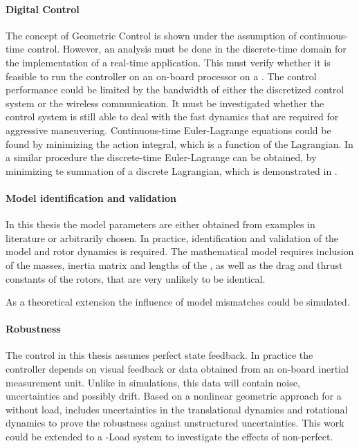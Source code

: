 \paragraph{Digital Control} The concept of Geometric Control is shown under the assumption of continuous-time control. 
However, an analysis must be done in the discrete-time domain for the implementation of a real-time application. This must verify whether it is feasible to run the controller on an on-board processor on a . The control performance could be limited by the bandwidth of either the discretized control system or the wireless communication.
It must be investigated whether the control system is still able to deal with the fast dynamics that are required for aggressive maneuvering. 
Continuous-time Euler-Lagrange equations could be found by minimizing the action integral, which is a function of the Lagrangian. In a similar procedure the discrete-time Euler-Lagrange can be obtained, by minimizing te summation of a discrete Lagrangian, which is demonstrated in \cite{Lee2008}. 

\paragraph{Model identification and validation}
In this thesis the model parameters are either obtained from examples in literature or arbitrarily chosen. In practice, identification and validation of the  model and rotor dynamics is required.
The mathematical model requires inclusion of the masses, inertia matrix and lengths of the , as well as the drag and thrust constants of the rotors, that are very unlikely to be identical.

As a theoretical extension the influence of model mismatches could be simulated.

\paragraph{Robustness}
The control in this thesis assumes perfect state feedback. In practice the controller depends on visual feedback or data obtained from an on-board inertial measurement unit. Unlike in simulations, this data will contain noise, uncertainties and possibly drift. 
Based on a nonlinear geometric approach for a  without load, \cite{Goodarzi2013a} includes uncertainties in the translational dynamics and rotational dynamics to prove the robustness against unstructured uncertainties. This work could be extended to a -Load system to investigate the effects of non-perfect. 

